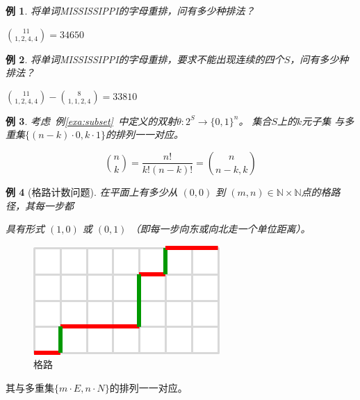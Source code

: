 \documentclass[13pt, punct]{ctexbeamer}
\newtheorem{ex}{例}[section]
\begin{document}
\begin{frame}
\begin{ex}
将单词MISSISSIPPI的字母重排，问有多少种排法？
\end{ex}

\pause
$\displaystyle {11 \choose {1,2,4,4}} = 34650$

\begin{ex}	将单词MISSISSIPPI的字母重排，要求不能出现连续的四个$S$，问有多少种排法？\end{ex}
\pause
$\displaystyle {11 \choose {1,2,4,4}}-{8 \choose {1,1,2,4}}=33810$

\end{frame}

\begin{frame}
\begin{ex}
	考虑\, 例\ref{exa:subset}\, 中定义的双射$\theta \colon 2^S\rightarrow \{0,1\}^n$。
	集合$S$上的\alert{$k$元子集} 与多重集$\{(n-k) \cdot 0, k \cdot 1\}$的排列一一对应。
\end{ex}

\pause $${n \choose k} = \frac{n!}{k!(n-k)!} = {n \choose n-k, k}$$
\end{frame}

\begin{frame}



\begin{ex}[格路计数问题]
在平面上有多少从 $(0,0)$ 到 $(m,n)\in \mathbb{N}\times\mathbb{N}$点的格路径，其每一步都

具有形式 $(1,0)$ 或 $(0,1)$ （即每一步向东或向北走一个单位距离）。
\end{ex}
    \begin{figure}
    \centering
    \includegraphics[scale=0.3]{path.png}
    \caption{格路}
\end{figure}

\pause

其与多重集$\{m \cdot E, n \cdot N\}$的排列一一对应。



\end{frame}
\end{document}
